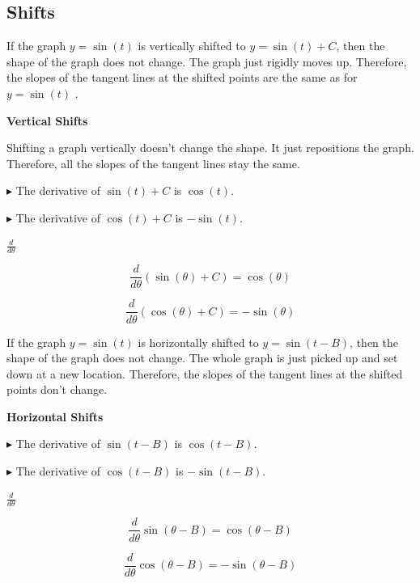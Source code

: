 \documentclass{ximera}
\begin{document}
\subsection*{Shifts}




If the graph $y = \sin(t)$ is vertically shifted to $y = \sin(t)+C$, then the shape of the graph does not change. The graph just rigidly moves up. Therefore, the slopes of the tangent lines at the shifted points are the same as for $y = \sin(t)$ .



\begin{observation} \textbf{\textcolor{-red!75}{Vertical Shifts}}  

Shifting a graph vertically doesn't change the shape.  It just repositions the graph.  Therefore, all the slopes of the tangent lines stay the same. 



$\blacktriangleright$ The derivative of $\sin(t)+C$ is $\cos(t)$. 

$\blacktriangleright$ The derivative of $\cos(t)+C$ is $-\sin(t)$. 

\end{observation}


\begin{notation} \textbf{\textcolor{red!50!green}{$\frac{d}{d\theta}$}} 

\[
\frac{d}{d\theta} (\sin(\theta) + C) = \cos(\theta)
\]

\[
\frac{d}{d\theta} (\cos(\theta) + C) = -\sin(\theta)
\]

\end{notation}


If the graph $y = \sin(t)$ is horizontally shifted to $y = \sin(t - B)$, then the shape of the graph does not change. The whole graph is just picked up and set down at a new location. Therefore, the slopes of the tangent lines at the shifted points don't change.



\begin{observation} \textbf{\textcolor{-red!75}{Horizontal Shifts}} 

$\blacktriangleright$ The derivative of $\sin(t - B)$ is $\cos(t - B)$. 

$\blacktriangleright$ The derivative of $\cos(t - B)$ is $-\sin(t - B)$. 

\end{observation}


\begin{notation} \textbf{\textcolor{red!50!green}{$\frac{d}{d\theta}$}} 

\[
\frac{d}{d\theta} \sin(\theta - B) = \cos(\theta - B)
\]

\[
\frac{d}{d\theta} \cos(\theta - B) = -\sin(\theta - B)
\]

\end{notation}
\end{document}
